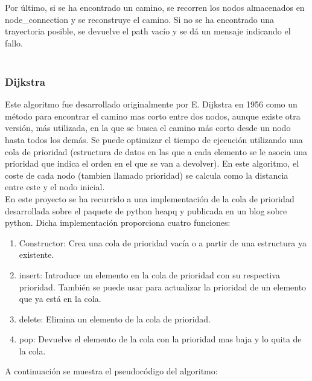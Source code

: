Por último, si se ha encontrado un camino, se recorren los nodos almacenados en node_connection y se reconstruye el camino. Si no se ha encontrado una trayectoria posible, se devuelve el path vacío y se dá un mensaje indicando el fallo.\\
\\

\subsubsection{Dijkstra}

Este algoritmo fue desarrollado originalmente por E. Dijkstra en 1956 como un método para encontrar el camino mas corto entre dos nodos, aunque existe otra versión, más utilizada, en la que se busca el camino más corto desde un nodo hasta todos los demás. Se puede optimizar el tiempo de ejecución utilizando una cola de prioridad (estructura de datos en las que a cada elemento se le asocia una prioridad que indica el orden en el que se van a devolver). En este algoritmo, el coste de cada nodo (tambien llamado prioridad) se calcula como la distancia entre este y el nodo inicial.\\ 

En este proyecto se ha recurrido a una implementación de la cola de prioridad desarrollada sobre el paquete de python heapq y publicada en un blog sobre python. Dicha implementación  proporciona cuatro funciones:\\

\begin{enumerate}
\item Constructor: Crea una cola de prioridad vacía o a partir de una estructura ya existente.
\item insert: Introduce un elemento en la cola de prioridad con su respectiva prioridad. También se puede usar para actualizar la prioridad de un elemento que ya está en la cola.
\item delete: Elimina un elemento de la cola de prioridad.
\item pop: Devuelve el elemento de la cola con la prioridad mas baja y lo quita de la cola. 
\end{enumerate}

A continuación se muestra el pseudocódigo del algoritmo:\\

